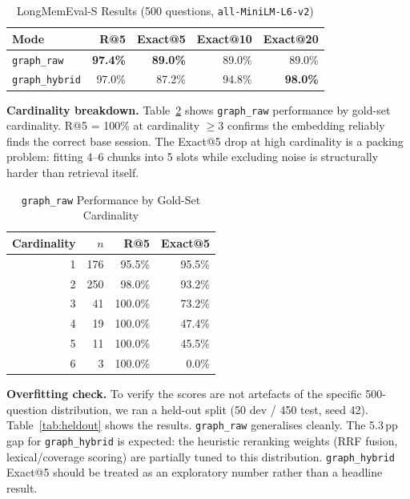 \documentclass[conference]{IEEEtran}
\begin{document}
\begin{table}[htbp]
\caption{LongMemEval-S Results (500 questions, \texttt{all-MiniLM-L6-v2})}
\label{tab:longmemeval}
\centering
\begin{tabular}{lrrrr}
\toprule
\textbf{Mode} & \textbf{R@5} & \textbf{Exact@5} & \textbf{Exact@10} & \textbf{Exact@20} \\
\midrule
\texttt{graph\_raw}    & \textbf{97.4\%} & \textbf{89.0\%} & 89.0\% & 89.0\% \\
\texttt{graph\_hybrid} & 97.0\%          & 87.2\%          & 94.8\% & \textbf{98.0\%} \\
\bottomrule
\end{tabular}
\end{table}

\textbf{Cardinality breakdown.} Table~\ref{tab:cardinality} shows \texttt{graph\_raw}
performance by gold-set cardinality. R@5 = 100\% at cardinality $\geq 3$ confirms the
embedding reliably finds the correct base session. The Exact@5 drop at high cardinality is
a packing problem: fitting 4--6 chunks into 5 slots while excluding noise is structurally
harder than retrieval itself.

\begin{table}[htbp]
\caption{\texttt{graph\_raw} Performance by Gold-Set Cardinality}
\label{tab:cardinality}
\centering
\begin{tabular}{rrrr}
\toprule
\textbf{Cardinality} & \textbf{$n$} & \textbf{R@5} & \textbf{Exact@5} \\
\midrule
1 & 176 & 95.5\% & 95.5\% \\
2 & 250 & 98.0\% & 93.2\% \\
3 &  41 & 100.0\% & 73.2\% \\
4 &  19 & 100.0\% & 47.4\% \\
5 &  11 & 100.0\% & 45.5\% \\
6 &   3 & 100.0\% &  0.0\% \\
\bottomrule
\end{tabular}
\end{table}

\textbf{Overfitting check.} To verify the scores are not artefacts of the specific
500-question distribution, we ran a held-out split (50 dev / 450 test, seed 42).
Table~\ref{tab:heldout} shows the results. \texttt{graph\_raw} generalises cleanly.
The 5.3\,pp gap for \texttt{graph\_hybrid} is expected: the heuristic reranking weights
(RRF fusion, lexical/coverage scoring) are partially tuned to this distribution.
\texttt{graph\_hybrid} Exact@5 should be treated as an exploratory number rather than a
headline result.
\end{document}
